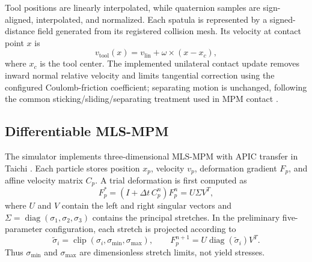 Tool positions are linearly interpolated, while quaternion samples are sign-aligned, interpolated, and normalized. Each spatula is represented by a signed-distance field generated from its registered collision mesh. Its velocity at contact point $x$ is
\begin{equation}
 v_{\mathrm{tool}}(x)=v_{\mathrm{lin}}+\omega\times(x-x_c),
 \label{eq:tool_velocity}
\end{equation}
where $x_c$ is the tool center. The implemented unilateral contact update removes inward normal relative velocity and limits tangential correction using the configured Coulomb-friction coefficient; separating motion is unchanged, following the common sticking/sliding/separating treatment used in MPM contact \cite{stomakhin2013snow}.

\subsection{Differentiable MLS-MPM}

The simulator implements three-dimensional MLS-MPM with APIC transfer \cite{hu2018mlsmpm,jiang2015apic} in Taichi \cite{hu2019taichi}. Each particle stores position $x_p$, velocity $v_p$, deformation gradient $F_p$, and affine velocity matrix $C_p$. A trial deformation is first computed as
\begin{equation}
 F_p^*=(I+\Delta t\,C_p^n)F_p^n=U\Sigma V^T,
 \label{eq:deformation_trial}
\end{equation}
where $U$ and $V$ contain the left and right singular vectors and $\Sigma=\operatorname{diag}(\sigma_1,\sigma_2,\sigma_3)$ contains the principal stretches. In the preliminary five-parameter configuration, each stretch is projected according to
\begin{equation}
 \tilde\sigma_i=\operatorname{clip}(\sigma_i,\sigma_{\min},\sigma_{\max}),\qquad
 F_p^{n+1}=U\operatorname{diag}(\tilde\sigma_i)V^T.
 \label{eq:stretch_projection}
\end{equation}
Thus $\sigma_{\min}$ and $\sigma_{\max}$ are dimensionless stretch limits, not yield stresses.

